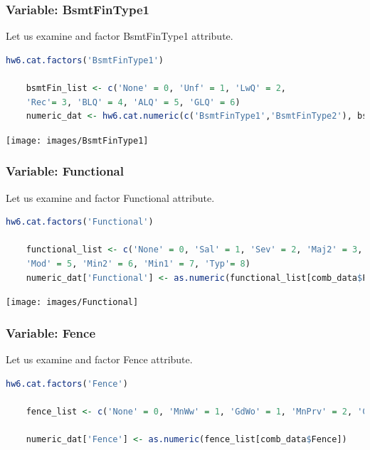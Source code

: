 \documentclass[sigconf]{acmart}
\begin{document}
	\subsubsection {Variable: BsmtFinType1}
	
	
	Let us examine and factor BsmtFinType1 attribute.
	
	\begin{lstlisting}[language=R]
	hw6.cat.factors('BsmtFinType1')
	
	bsmtFin_list <- c('None' = 0, 'Unf' = 1, 'LwQ' = 2,
	'Rec'= 3, 'BLQ' = 4, 'ALQ' = 5, 'GLQ' = 6)
	numeric_dat <- hw6.cat.numeric(c('BsmtFinType1','BsmtFinType2'), bsmtFin_list, numeric_dat)
	\end{lstlisting}
	
	\begin{center}
		\texttt{[image: images/BsmtFinType1]}	
	\end{center}
	
	
	\subsubsection {Variable: Functional}

	
	Let us examine and factor Functional attribute.
	
	\begin{lstlisting}[language=R]
	hw6.cat.factors('Functional')
	
	functional_list <- c('None' = 0, 'Sal' = 1, 'Sev' = 2, 'Maj2' = 3, 'Maj1' = 4,
	'Mod' = 5, 'Min2' = 6, 'Min1' = 7, 'Typ'= 8)
	numeric_dat['Functional'] <- as.numeric(functional_list[comb_data$Functional])
	\end{lstlisting}
	
	\begin{center}
		\texttt{[image: images/Functional]}	
	\end{center}
	
	\subsubsection {Variable: Fence}
	
	
	Let us examine and factor Fence attribute.
	
	\begin{lstlisting}[language=R]
	hw6.cat.factors('Fence')
	
	fence_list <- c('None' = 0, 'MnWw' = 1, 'GdWo' = 1, 'MnPrv' = 2, 'GdPrv' = 4)
	
	numeric_dat['Fence'] <- as.numeric(fence_list[comb_data$Fence])
	\end{lstlisting}
	
\end{document}
